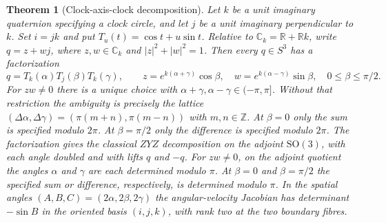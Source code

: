 \documentclass[11pt,reqno]{amsart}
\newtheorem{theorem}{Theorem}[section]
\theoremstyle{definition}
\theoremstyle{remark}
\numberwithin{equation}{section}
\newcommand{\R}{\mathbb{R}}
\newcommand{\C}{\mathbb{C}}
\newcommand{\Z}{\mathbb{Z}}
\newcommand{\SO}{\mathrm{SO}}
\begin{document}
\begin{theorem}[Clock-axis-clock decomposition]\label{m7:zyz}
Let $k$ be a unit imaginary quaternion specifying a clock circle,
and let $j$ be a unit imaginary perpendicular to $k$. Set $i=jk$ and put
$T_u(t)=\cos t+u\sin t$. Relative to
$\C_k=\R+\R k$, write $q=z+w j$, where $z,w\in\C_k$ and
$|z|^2+|w|^2=1$. Then every $q\in S^3$ has a factorization
\[
 q=T_k(\alpha)T_j(\beta)T_k(\gamma),\qquad
 z=e^{k(\alpha+\gamma)}\cos\beta,\quad
 w=e^{k(\alpha-\gamma)}\sin\beta,\quad
 0\le\beta\le\pi/2 .
\]
For $zw\ne0$ there is a unique choice with
$\alpha+\gamma,\alpha-\gamma\in(-\pi,\pi]$. Without that restriction
the ambiguity is precisely the lattice
$(\Delta\alpha,\Delta\gamma)=(\pi(m+n),\pi(m-n))$ with $m,n\in\Z$.
At $\beta=0$ only the sum is specified modulo $2\pi$.
At $\beta=\pi/2$ only the difference is specified modulo $2\pi$.
The factorization gives the classical $Z Y Z$ decomposition on the
adjoint $\SO(3)$, with each angle doubled and with lifts $q$ and $-q$.
For $zw\ne0$, on the adjoint quotient the angles $\alpha$ and $\gamma$
are each determined modulo $\pi$. At $\beta=0$ and $\beta=\pi/2$ the
specified sum or difference, respectively, is determined modulo $\pi$.
In the spatial angles $(A,B,C)=(2\alpha,2\beta,2\gamma)$ the
angular-velocity Jacobian has determinant $-\sin B$ in the
oriented basis $(i,j,k)$, with rank two at the two boundary fibres.
\end{theorem}
\end{document}

